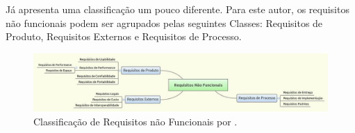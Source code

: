 Já  apresenta uma classificação um pouco diferente. Para este autor, os requisitos não funcionais podem ser agrupados pelas seguintes Classes: Requisitos de Produto, Requisitos Externos e Requisitos de Processo.

\begin{figure}[h]
\centering
\includegraphics[keepaspectratio=true,scale=0.35]{figuras/RNF2.jpg}
\caption{Classificação de Requisitos não Funcionais por .}
\label{RNF1}
\end{figure}

